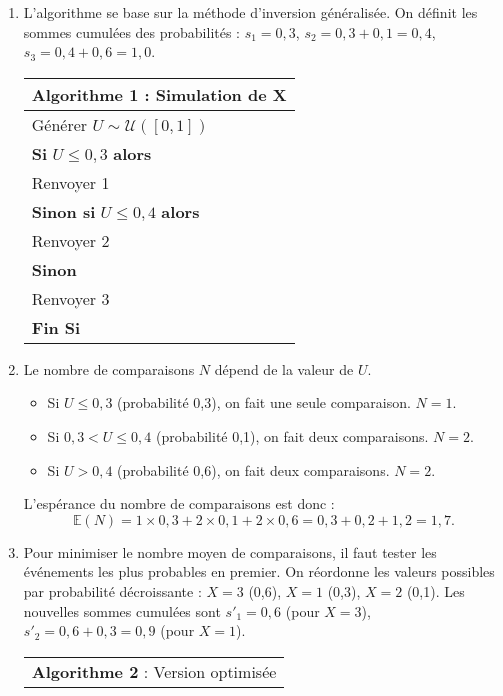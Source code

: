 \documentclass[solutions]{exercices}
\begin{document}
\begin{solution}
\begin{enumerate}
\item L'algorithme se base sur la méthode d'inversion généralisée. On définit les sommes cumulées des probabilités : $s_1 = 0,3$, $s_2 = 0,3 + 0,1 = 0,4$, $s_3 = 0,4 + 0,6 = 1,0$.
\begin{center}
\begin{tabular}{l}
\hline
\textbf{Algorithme 1} : Simulation de X \\
\hline
Générer $U \sim \mathcal{U}([0,1])$ \\
\textbf{Si} $U \leq 0,3$ \textbf{alors} \\
\hspace{1cm} Renvoyer 1 \\
\textbf{Sinon si} $U \leq 0,4$ \textbf{alors} \\
\hspace{1cm} Renvoyer 2 \\
\textbf{Sinon} \\
\hspace{1cm} Renvoyer 3 \\
\textbf{Fin Si} \\
\hline
\end{tabular}
\end{center}
\item Le nombre de comparaisons $N$ dépend de la valeur de $U$.
\begin{itemize}
    \item Si $U \leq 0,3$ (probabilité 0,3), on fait une seule comparaison. $N=1$.
    \item Si $0,3 < U \leq 0,4$ (probabilité 0,1), on fait deux comparaisons. $N=2$.
    \item Si $U > 0,4$ (probabilité 0,6), on fait deux comparaisons. $N=2$.
\end{itemize}
L'espérance du nombre de comparaisons est donc :
\[ \mathbb{E}(N) = 1 \times 0,3 + 2 \times 0,1 + 2 \times 0,6 = 0,3 + 0,2 + 1,2 = 1,7. \]
\item Pour minimiser le nombre moyen de comparaisons, il faut tester les événements les plus probables en premier. On réordonne les valeurs possibles par probabilité décroissante : $X=3$ (0,6), $X=1$ (0,3), $X=2$ (0,1).
Les nouvelles sommes cumulées sont $s'_1=0,6$ (pour $X=3$), $s'_2=0,6+0,3=0,9$ (pour $X=1$).
\begin{center}
\begin{tabular}{l}
\hline
\textbf{Algorithme 2} : Version optimisée \\

\end{tabular}
\end{center}
\end{enumerate}
\end{solution}
\end{document}
